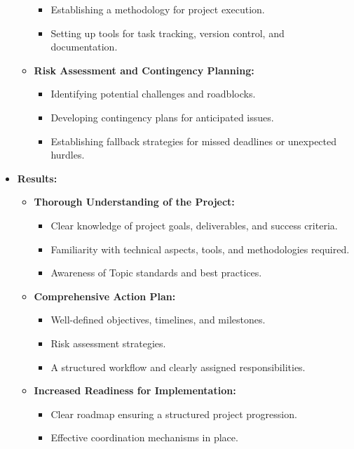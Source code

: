 \documentclass{article}
\begin{document}
\begin{itemize}[leftmargin=*, label={}]
\begin{itemize}
\begin{itemize}
                    \item Establishing a methodology for project execution.
                    \item Setting up tools for task tracking, version control, and documentation.
                \end{itemize}
            \item \textbf{Risk Assessment and Contingency Planning:}
                \begin{itemize}
                    \item Identifying potential challenges and roadblocks.
                    \item Developing contingency plans for anticipated issues.
                    \item Establishing fallback strategies for missed deadlines or unexpected hurdles.
                \end{itemize}
        \end{itemize}

    \item \textbf{Results:}
        \begin{itemize}
            \item \textbf{Thorough Understanding of the Project:}
                \begin{itemize}
                    \item Clear knowledge of project goals, deliverables, and success criteria.
                    \item Familiarity with technical aspects, tools, and methodologies required.
                    \item Awareness of Topic standards and best practices.
                \end{itemize}
            \item \textbf{Comprehensive Action Plan:}
                \begin{itemize}
                    \item Well-defined objectives, timelines, and milestones.
                    \item Risk assessment strategies.
                    \item A structured workflow and clearly assigned responsibilities.
                \end{itemize}
            \item \textbf{Increased Readiness for Implementation:}
                \begin{itemize}
                    \item Clear roadmap ensuring a structured project progression.
                    \item Effective coordination mechanisms in place.
                \end{itemize}
        \end{itemize}
\end{itemize}
\end{document}
